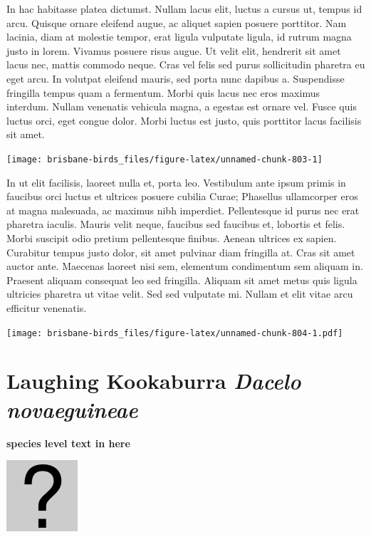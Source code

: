 \documentclass[]{book}
\let\origfigure\figure
\let\endorigfigure\endfigure
\renewenvironment{figure}[1][2] {
  \expandafter\origfigure\expandafter[H]
} {
  \endorigfigure
}
\begin{document}
In hac habitasse platea dictumst. Nullam lacus elit, luctus a cursus ut,
tempus id arcu. Quisque ornare eleifend augue, ac aliquet sapien posuere
porttitor. Nam lacinia, diam at molestie tempor, erat ligula vulputate
ligula, id rutrum magna justo in lorem. Vivamus posuere risus augue. Ut
velit elit, hendrerit sit amet lacus nec, mattis commodo neque. Cras vel
felis sed purus sollicitudin pharetra eu eget arcu. In volutpat eleifend
mauris, sed porta nunc dapibus a. Suspendisse fringilla tempus quam a
fermentum. Morbi quis lacus nec eros maximus interdum. Nullam venenatis
vehicula magna, a egestas est ornare vel. Fusce quis luctus orci, eget
congue dolor. Morbi luctus est justo, quis porttitor lacus facilisis sit
amet.

\begin{figure}
\texttt{[image: brisbane-birds\_files/figure-latex/unnamed-chunk-803-1]} \caption{insert figure caption}\label{fig:unnamed-chunk-803}
\end{figure}

In ut elit facilisis, laoreet nulla et, porta leo. Vestibulum ante ipsum
primis in faucibus orci luctus et ultrices posuere cubilia Curae;
Phasellus ullamcorper eros at magna malesuada, ac maximus nibh
imperdiet. Pellentesque id purus nec erat pharetra iaculis. Mauris velit
neque, faucibus sed faucibus et, lobortis et felis. Morbi suscipit odio
pretium pellentesque finibus. Aenean ultrices ex sapien. Curabitur
tempus justo dolor, sit amet pulvinar diam fringilla at. Cras sit amet
auctor ante. Maecenas laoreet nisi sem, elementum condimentum sem
aliquam in. Praesent aliquam consequat leo sed fringilla. Aliquam sit
amet metus quis ligula ultricies pharetra ut vitae velit. Sed sed
vulputate mi. Nullam et elit vitae arcu efficitur venenatis.

\begin{figure}
\centering
\texttt{[image: brisbane-birds\_files/figure-latex/unnamed-chunk-804-1.pdf]}
\caption{\label{fig:unnamed-chunk-804}insert figure caption}
\end{figure}

\section{\texorpdfstring{Laughing Kookaburra \emph{Dacelo
novaeguineae}}{Laughing Kookaburra Dacelo novaeguineae}}\label{laughing-kookaburra-dacelo-novaeguineae}

\textbf{species level text in here}

\begin{figure}
\centering
\includegraphics{assets/missing.png}
\caption{No image for species}
\end{figure}
\end{document}
